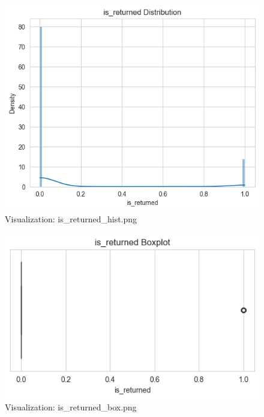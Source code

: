 \documentclass{article}%
\begin{document}
\vspace{10pt}%
\\%
\begin{minipage}[c]{0.48\textwidth}%


\begin{figure}[H]%
\centering%
\includegraphics[width=\linewidth]{output/plots/is_returned_hist.png}%
\caption{Visualization: is\_returned\_hist.png}%
\end{figure}

%
\end{minipage}%
\begin{minipage}[c]{0.48\textwidth}%


\begin{figure}[H]%
\centering%
\includegraphics[width=\linewidth]{output/plots/is_returned_box.png}%
\caption{Visualization: is\_returned\_box.png}%
\end{figure}

%
\end{minipage}%
\end{document}
